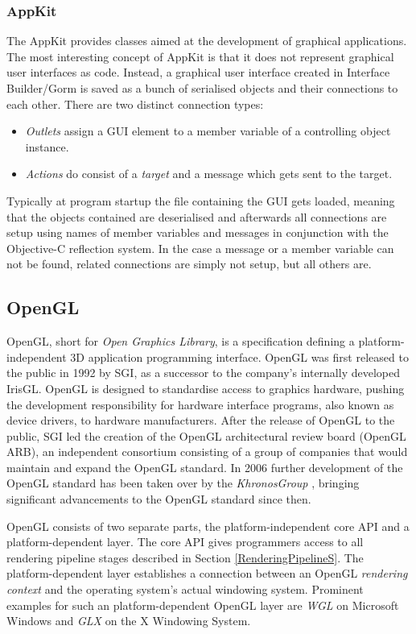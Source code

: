 \subsubsection{AppKit}

The AppKit provides classes aimed at the development of graphical applications.
The most interesting concept of AppKit is that it does not represent graphical
user interfaces as code. Instead, a graphical user interface created in
Interface Builder/Gorm is saved as a bunch of serialised objects and their
connections to each other. There are two distinct connection types:
\begin{itemize}
 \item \textit{Outlets} assign a GUI element to a member variable of a
controlling object instance.
 \item \textit{Actions} do consist of a \textit{target} and a message which
gets sent to the target.
\end{itemize}

Typically at program startup the file containing the GUI gets loaded, meaning
that the objects contained are deserialised and afterwards all connections are
setup using names of member variables and messages in conjunction with the
Objective-C reflection system. In the case a message or a member variable can
not be found, related connections are simply not setup, but all others are.

\subsection{OpenGL}
OpenGL, short for \textit{Open Graphics Library}, is a specification defining a
platform-independent 3D application programming interface. OpenGL was first
released to the public in 1992 by SGI, as a successor to the company's
internally developed IrisGL. OpenGL is designed to standardise access to
graphics hardware, pushing the development responsibility for hardware interface
programs, also known as device drivers, to hardware manufacturers. After the
release of OpenGL to the public, SGI led the creation of the OpenGL
architectural review board (OpenGL ARB)\cite{misc:opengl-arb}, an independent
consortium consisting of a group of companies that would maintain and expand the
OpenGL standard. In 2006 further development of the OpenGL standard has been
taken over by the \textit{KhronosGroup} \cite{misc:opengl-khronos}, bringing
significant advancements to the OpenGL standard since then.

OpenGL consists of two separate parts, the platform-independent core API and a
platform-dependent layer. The core API gives programmers access to all
rendering pipeline stages described in Section \ref{RenderingPipelineS}. The
platform-dependent layer establishes a connection between an OpenGL
\textit{rendering context} and the operating system's actual windowing system.
Prominent examples for such an platform-dependent OpenGL layer are \textit{WGL}
on Microsoft Windows and \textit{GLX} on the X Windowing System.

